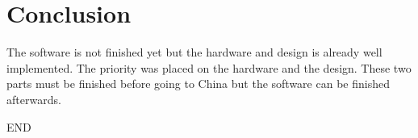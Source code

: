 \section{Conclusion}

The software is not finished yet but the hardware and design is already well implemented. The priority was placed on the hardware and the design. These two parts must be finished before going to China but the software can be finished afterwards.

END
